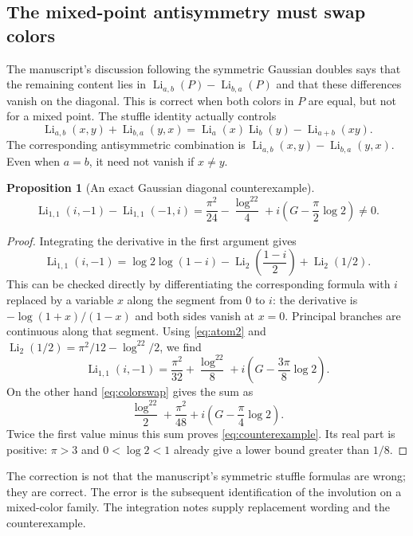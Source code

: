 \documentclass[11pt]{article}
\numberwithin{equation}{section}
\newtheorem{proposition}[theorem]{Proposition}
\theoremstyle{definition}\newtheorem{definition}[theorem]{Definition}
\theoremstyle{remark}\newtheorem{remark}[theorem]{Remark}
\DeclareMathOperator{\Li}{Li}
\begin{document}
\subsection{The mixed-point antisymmetry must swap colors}
The manuscript's discussion following the symmetric Gaussian doubles
says that the remaining content lies in
$\Li_{a,b}(P)-\Li_{b,a}(P)$ and that these differences vanish on the
diagonal. This is correct when both colors in $P$ are equal, but not
for a mixed point. The stuffle identity actually controls
\begin{equation}\label{eq:colorswap}
 \Li_{a,b}(x,y)+\Li_{b,a}(y,x)
 =\Li_a(x)\Li_b(y)-\Li_{a+b}(xy).
\end{equation}
The corresponding antisymmetric combination is
$\Li_{a,b}(x,y)-\Li_{b,a}(y,x)$.
Even when $a=b$, it need not vanish if $x\ne y$.

\begin{proposition}[An exact Gaussian diagonal counterexample]
\label{prop:mixedcorrection}
\begin{equation}\label{eq:counterexample}
 \Li_{1,1}(i,-1)-\Li_{1,1}(-1,i)
 =\frac{\pi^2}{24}-\frac{\log^22}{4}
 +i\left(G-\frac\pi2\log2\right)\ne0.
\end{equation}
\end{proposition}
\begin{proof}
Integrating the derivative in the first argument gives
\[
 \Li_{1,1}(i,-1)
 =\log2\log(1-i)-\Li_2\left(\frac{1-i}{2}\right)+\Li_2(1/2).
\]
This can be checked directly by differentiating the corresponding
formula with $i$ replaced by a variable $x$ along the segment from $0$
to $i$: the derivative is $-\log(1+x)/(1-x)$ and both sides vanish
at $x=0$. Principal branches are continuous along that segment.
Using \eqref{eq:atom2} and
$\Li_2(1/2)=\pi^2/12-\log^22/2$, we find
\[
 \Li_{1,1}(i,-1)
 =\frac{\pi^2}{32}+\frac{\log^22}{8}
 +i\left(G-\frac{3\pi}{8}\log2\right).
\]
On the other hand \eqref{eq:colorswap} gives the sum as
\[
 \frac{\log^22}{2}+\frac{\pi^2}{48}
 +i\left(G-\frac\pi4\log2\right).
\]
Twice the first value minus this sum proves \eqref{eq:counterexample}.
Its real part is positive: $\pi>3$ and $0<\log2<1$ already give a
lower bound greater than $1/8$.
\end{proof}

The correction is not that the manuscript's symmetric stuffle formulas
are wrong; they are correct. The error is the subsequent identification
of the involution on a mixed-color family. The integration notes supply
replacement wording and the counterexample.
\end{document}
